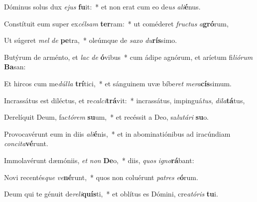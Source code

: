 \item Dóminus solus dux \textit{e}\textit{jus} \textbf{fu}it:~* et non erat cum eo de\textit{us} \textit{a}\textit{li}\textbf{é}nus.
\item Constítuit eum super ex\textit{cél}\textit{sam} \textbf{ter}ram:~* ut coméderet \textit{fruc}\textit{tus} \textit{a}\textbf{gró}rum,
\item Ut súgeret \textit{mel} \textit{de} \textbf{pe}tra,~* oleúmque de \textit{sa}\textit{xo} \textit{du}\textbf{rís}simo.
\item Butýrum de arménto, et \textit{lac} \textit{de} \textbf{ó}vibus~* cum ádipe agnórum, et aríetum fi\textit{li}\textit{ó}\textit{rum} \textbf{Ba}san:
\item Et hircos cum me\textit{dúl}\textit{la} \textbf{trí}tici,~* et sánguinem uvæ bíbe\textit{ret} \textit{me}\textit{ra}\textbf{cís}simum.
\item Incrassátus est diléctus, et re\textit{cal}\textit{ci}\textbf{trá}vit:~* incrassátus, impinguá\textit{tus}, \textit{di}\textit{la}\textbf{tá}tus,
\item Derelíquit Deum, fac\textit{tó}\textit{rem} \textbf{su}um,~* et recéssit a Deo, sa\textit{lu}\textit{tá}\textit{ri} \textbf{su}o.
\item Provocavérunt eum in diis \textit{a}\textit{li}\textbf{é}nis,~* et in abominatiónibus ad iracúndiam \textit{con}\textit{ci}\textit{ta}\textbf{vé}runt.
\item Immolavérunt dæmóniis, \textit{et} \textit{non} \textbf{De}o,~* diis, \textit{quos} \textit{i}\textit{gno}\textbf{rá}bant:
\item Novi recentés\textit{que} \textit{ve}\textbf{né}runt,~* quos non coluérunt \textit{pa}\textit{tres} \textit{e}\textbf{ó}rum.
\item Deum qui te génuit de\textit{re}\textit{li}\textbf{quís}ti,~* et oblítus es Dómini, cre\textit{a}\textit{tó}\textit{ris} \textbf{tu}i.
